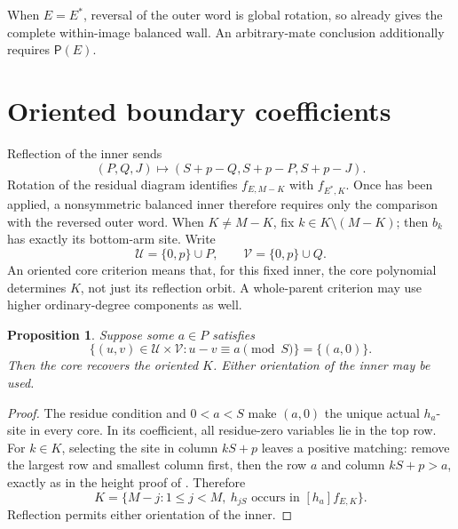 \documentclass[11pt,a4paper]{amsart}
\numberwithin{equation}{section}
\theoremstyle{plain}
\newtheorem{proposition}[theorem]{Proposition}
\theoremstyle{definition}
\begin{document}
When \(E=E^*\), reversal of the outer word is global rotation, so  already gives the complete within-image balanced wall.  An arbitrary-mate conclusion additionally requires \(\mathsf P(E)\).

\section{Oriented boundary coefficients}\label{sec:orientation}

Reflection of the inner sends
\begin{equation}\label{eq:reflection}
 (P,Q,J)\longmapsto(S+p-Q,S+p-P,S+p-J).
\end{equation}
Rotation of the residual diagram identifies \(f_{E,M-K}\) with \(f_{E^*,K}\).  Once  has been applied, a nonsymmetric balanced inner therefore requires only the comparison with the reversed outer word.  When \(K\ne M-K\), fix \(k\in K\setminus(M-K)\); then \(b_k\) has exactly its bottom-arm site.  Write
\[
 \mathcal U=\{0,p\}\cup P,\qquad \mathcal V=\{0,p\}\cup Q.
\]
An oriented core criterion means that, for this fixed inner, the core polynomial determines \(K\), not just its reflection orbit.  A whole-parent criterion may use higher ordinary-degree components as well.

\begin{proposition}\label{prop:private-residue}
Suppose some \(a\in P\) satisfies
\begin{equation}\label{eq:private-residue}
 \{(u,v)\in\mathcal U\times\mathcal V:u-v\equiv a\pmod S\}
 =\{(a,0)\}.
\end{equation}
Then the core recovers the oriented \(K\).  Either orientation of the inner may be used.
\end{proposition}
\begin{proof}
The residue condition and \(0<a<S\) make \((a,0)\) the unique actual \(h_a\)-site in every core.  In its coefficient, all residue-zero variables lie in the top row.  For \(k\in K\), selecting the site in column \(kS+p\) leaves a positive matching: remove the largest row and smallest column first, then the row \(a\) and column \(kS+p>a\), exactly as in the height proof of .  Therefore
\[
 K=\{M-j:1\le j<M,\ h_{jS}\text{ occurs in }[h_a]f_{E,K}\}.
\]
Reflection permits either orientation of the inner.
\end{proof}
\end{document}
